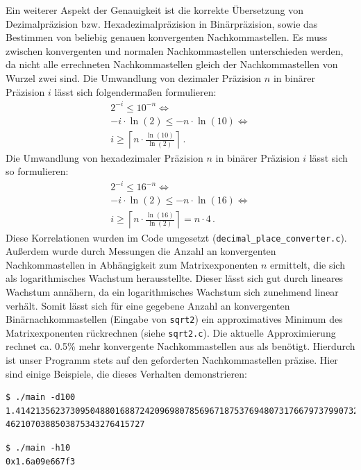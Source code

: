 \documentclass[course=erap]{aspdoc}
\begin{document}
Ein weiterer Aspekt der Genauigkeit ist die korrekte Übersetzung von Dezimalpräzision bzw. Hexadezimalpräzision in Binärpräzision, sowie das Bestimmen von beliebig genauen konvergenten Nachkommastellen. Es muss zwischen konvergenten und normalen Nachkommastellen unterschieden werden, da nicht alle errechneten Nachkommastellen gleich der Nachkommastellen von Wurzel zwei sind.
Die Umwandlung von dezimaler Präzision $n$ in binärer Präzision $i$ lässt sich folgendermaßen formulieren:
\begin{align}
  2^{-i} \leq 10^{-n} \Leftrightarrow \nonumber \\
    -i \cdot \ln(2) \leq -n \cdot \ln(10) \Leftrightarrow \nonumber \\
  i \geq \left\lceil n \cdot \frac{\ln(10)}{\ln(2)} \right\rceil \, . \nonumber
\end{align} 
Die Umwandlung von hexadezimaler Präzision $n$ in binärer Präzision $i$ lässt sich so formulieren:
\begin{align}
  2^{-i} \leq 16^{-n} \Leftrightarrow \nonumber \\
    -i \cdot \ln(2) \leq -n \cdot \ln(16) \Leftrightarrow \nonumber \\
  i \geq \left\lceil n \cdot \frac{\ln(16)}{\ln(2)}\right\rceil = n \cdot 4 \, . \nonumber
\end{align}
Diese Korrelationen wurden im Code umgesetzt (\texttt{decimal\_place\_converter.c}).
Außerdem wurde durch Messungen die Anzahl an konvergenten Nachkommastellen in Abhängigkeit zum Matrixexponenten $n$ ermittelt, die sich als logarithmisches Wachstum herausstellte. Dieser lässt sich gut durch lineares Wachstum annähern, da ein logarithmisches Wachstum sich zunehmend linear verhält. Somit lässt sich für eine gegebene Anzahl an konvergenten Binärnachkommastellen (Eingabe von \texttt{sqrt2}) ein approximatives Minimum des Matrixexponenten rückrechnen (siehe \texttt{sqrt2.c}). Die aktuelle Approximierung rechnet ca. 0.5\% mehr konvergente Nachkommastellen aus als benötigt. Hierdurch ist unser Programm stets auf den geforderten Nachkommastellen präzise.
Hier sind einige Beispiele, die dieses Verhalten demonstrieren:

\begin{verbatim}
$ ./main -d100
1.414213562373095048801688724209698078569671875376948073176679737990732478
4621070388503875343276415727
\end{verbatim}

\begin{verbatim}
$ ./main -h10
0x1.6a09e667f3
\end{verbatim}
\end{document}
